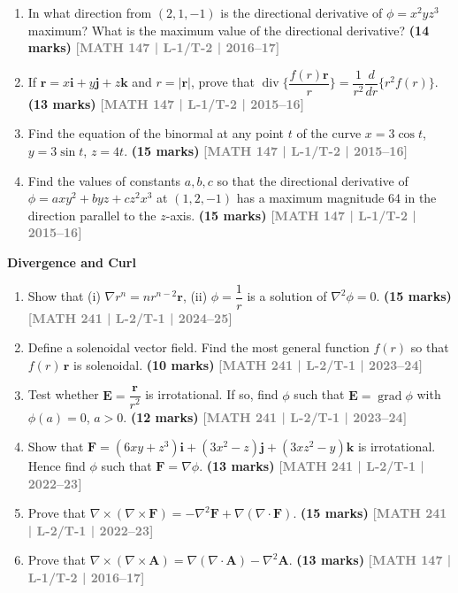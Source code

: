 \documentclass[12pt,a3paper]{article}
\newcommand{\yr}[1]{\hfill\textcolor{gray}{\small\textbf{[#1]}}}
\newcommand{\mk}[1]{\textcolor{orange!70!black}{\small\textbf{(#1 marks)}}}
\newcommand{\subtopic}[2]{%
  \vspace{10pt}
  \noindent\begin{tcolorbox}[colback=#1!8,colframe=#1,boxrule=0.6pt,arc=4pt,
    left=6pt,right=6pt,top=4pt,bottom=4pt]
    \small\bfseries\textcolor{#1}{#2}
  \end{tcolorbox}
  \vspace{2pt}
}
\begin{document}
\begin{enumerate}
\item In what direction from $(2,1,-1)$ is the directional derivative of $\phi=x^{2}yz^{3}$ maximum? What is the maximum value of the directional derivative?
\mk{14} \yr{MATH 147 | L-1/T-2 | 2016--17}


\item If $\mathbf{r}=x\mathbf{i}+y\mathbf{j}+z\mathbf{k}$ and $r=|\mathbf{r}|$, prove that $\operatorname{div}\{\dfrac{f(r)\mathbf{r}}{r}\}=\dfrac{1}{r^{2}}\dfrac{d}{dr}\{r^{2}f(r)\}$.
\mk{13} \yr{MATH 147 | L-1/T-2 | 2015--16}


\item Find the equation of the binormal at any point $t$ of the curve $x=3\cos t$, $y=3\sin t$, $z=4t$.
\mk{15} \yr{MATH 147 | L-1/T-2 | 2015--16}


\item Find the values of constants $a,b,c$ so that the directional derivative of $\phi=axy^{2}+byz+cz^{2}x^{3}$ at $(1,2,-1)$ has a maximum magnitude 64 in the direction parallel to the $z$-axis.
\mk{15} \yr{MATH 147 | L-1/T-2 | 2015--16}


\end{enumerate}

\subtopic{cD}{Divergence and Curl}
\label{sub:s4-divcurl}

\begin{enumerate}
    \item Show that (i) $\nabla r^{n}=nr^{n-2}\mathbf{r}$, (ii) $\phi=\dfrac{1}{r}$ is a solution of $\nabla^{2}\phi=0$.
\mk{15} \yr{MATH 241 | L-2/T-1 | 2024--25}


\item Define a solenoidal vector field. Find the most general function $f(r)$ so that $f(r)\,\mathbf{r}$ is solenoidal.
\mk{10} \yr{MATH 241 | L-2/T-1 | 2023--24}


\item Test whether $\mathbf{E}=\dfrac{\mathbf{r}}{r^{2}}$ is irrotational. If so, find $\phi$ such that $\mathbf{E}=\operatorname{grad}\phi$ with $\phi(a)=0$, $a>0$.
\mk{12} \yr{MATH 241 | L-2/T-1 | 2023--24}


\item Show that $\mathbf{F}=(6xy+z^{3})\mathbf{i}+(3x^{2}-z)\mathbf{j}+(3xz^{2}-y)\mathbf{k}$ is irrotational. Hence find $\phi$ such that $\mathbf{F}=\nabla\phi$.
\mk{13} \yr{MATH 241 | L-2/T-1 | 2022--23}


\item Prove that $\nabla\times(\nabla\times\mathbf{F})=-\nabla^{2}\mathbf{F}+\nabla(\nabla\cdot\mathbf{F})$.
\mk{15} \yr{MATH 241 | L-2/T-1 | 2022--23}


\item Prove that $\nabla\times(\nabla\times\mathbf{A})=\nabla(\nabla\cdot\mathbf{A})-\nabla^{2}\mathbf{A}$.
\mk{13} \yr{MATH 147 | L-1/T-2 | 2016--17}


\end{enumerate}
\end{document}
